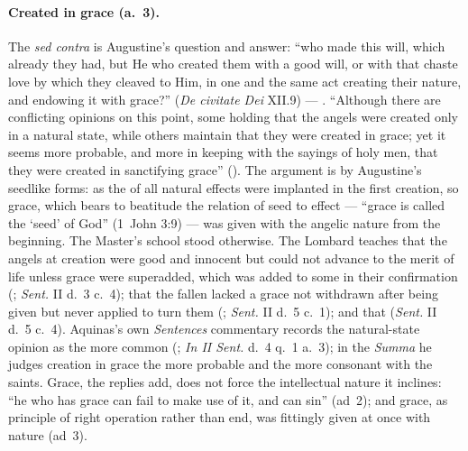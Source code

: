 \paragraph{Created in grace (a.~3).} The \emph{sed contra} is
Augustine's question and answer: ``who made this will, which already
they had, but He who created them with a good will, or with that chaste
love by which they cleaved to Him, in one and the same act creating
their nature, and endowing it with grace?'' (\emph{De civitate Dei}
XII.9) --- .
``Although there are conflicting opinions on this point, some holding
that the angels were created only in a natural state, while others
maintain that they were created in grace; yet it seems more probable,
and more in keeping with the sayings of holy men, that they were created
in sanctifying grace'' (). The argument
is by Augustine's seedlike forms: as the  of
all natural effects were implanted in the first creation, so grace,
which bears to beatitude the relation of seed to effect --- ``grace is
called the `seed' of God'' (1~John 3:9) --- was given with the angelic
nature from the beginning. The Master's school stood otherwise. The
Lombard teaches that the angels at creation were good and innocent but
could not advance to the merit of life unless grace were superadded,
which was added to some in their confirmation (; \emph{Sent.} II d.~3 c.~4); that the fallen
lacked a grace not withdrawn after being given but never applied to turn
them (; \emph{Sent.} II d.~5 c.~1); and that
 (\emph{Sent.} II d.~5 c.~4). Aquinas's own \emph{Sentences}
commentary records the natural-state opinion as the more common
(; \emph{In II Sent.} d.~4 q.~1 a.~3); in the
\emph{Summa} he judges creation in grace the more probable and the more
consonant with the saints. Grace, the replies add, does not force the
intellectual nature it inclines: ``he who has grace can fail to make use
of it, and can sin'' (ad~2); and grace, as principle of right operation
rather than end, was fittingly given at once with nature (ad~3).

